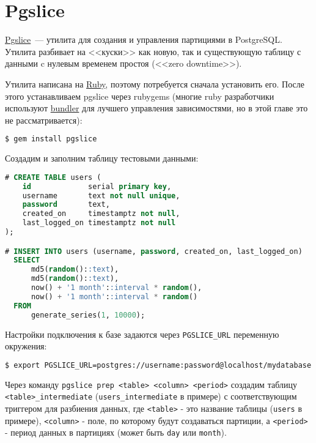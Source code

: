 \section{Pgslice}

\href{https://github.com/ankane/pgslice}{Pgslice}~--- утилита для создания и управления партициями в PostgreSQL. Утилита разбивает на <<куски>> как новую, так и существующую таблицу с данными c нулевым временем простоя (<<zero downtime>>).

Утилита написана на \href{https://www.ruby-lang.org}{Ruby}, поэтому потребуется сначала установить его. После этого устанавливаем pgslice через rubygems (многие ruby разработчики используют \href{http://bundler.io/}{bundler} для лучшего управления зависимостями, но в этой главе это не рассматривается):

\begin{lstlisting}[language=Bash,label=lst:pgslice1,caption=Установка]
$ gem install pgslice
\end{lstlisting}

Создадим и заполним таблицу тестовыми данными:

\begin{lstlisting}[language=SQL,label=lst:pgslice2,caption=Данные]
# CREATE TABLE users (
    id             serial primary key,
    username       text not null unique,
    password       text,
    created_on     timestamptz not null,
    last_logged_on timestamptz not null
);

# INSERT INTO users (username, password, created_on, last_logged_on)
  SELECT
      md5(random()::text),
      md5(random()::text),
      now() + '1 month'::interval * random(),
      now() + '1 month'::interval * random()
  FROM
      generate_series(1, 10000);
\end{lstlisting}

Настройки подключения к базе задаются через \lstinline!PGSLICE_URL! переменную окружения:

\begin{lstlisting}[language=Bash,label=lst:pgslice3,caption=PGSLICE\_URL]
$ export PGSLICE_URL=postgres://username:password@localhost/mydatabase
\end{lstlisting}

Через команду \lstinline!pgslice prep <table> <column> <period>! создадим таблицу \lstinline!<table>_intermediate! (\lstinline!users_intermediate! в примере) с соответствующим триггером для разбиения данных, где \lstinline!<table>! - это название таблицы (\lstinline!users! в примере), \lstinline!<column>! - поле, по которому будут создаваться партиции, а \lstinline!<period>! - период данных в партициях (может быть \lstinline!day! или \lstinline!month!).

